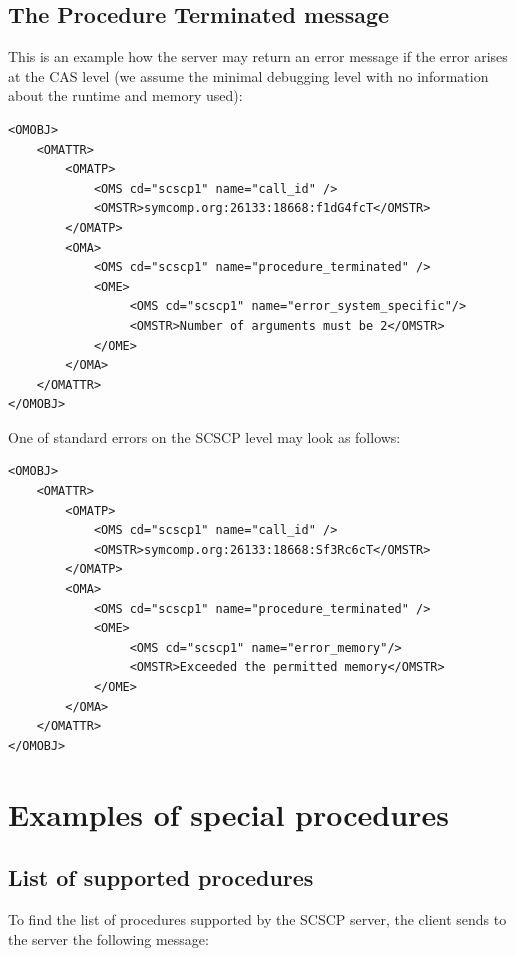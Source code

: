 \documentclass{amsart}
\begin{document}
\newpage

\subsection{The Procedure Terminated message}

This is an example how the server
may return an error message if the error arises at the CAS level
(we assume the minimal debugging level with no information 
about the runtime and memory used):

\begin{verbatim}
<OMOBJ>
    <OMATTR>
        <OMATP>
            <OMS cd="scscp1" name="call_id" />
            <OMSTR>symcomp.org:26133:18668:f1dG4fcT</OMSTR>
        </OMATP>
        <OMA>
            <OMS cd="scscp1" name="procedure_terminated" />
            <OME>
                 <OMS cd="scscp1" name="error_system_specific"/>
                 <OMSTR>Number of arguments must be 2</OMSTR>
            </OME>
        </OMA>
    </OMATTR>
</OMOBJ>
\end{verbatim}

\vspace{10pt}
One of standard errors on the SCSCP level may look as follows:
\vspace{5pt}

\begin{verbatim}
<OMOBJ>
    <OMATTR>
        <OMATP>
            <OMS cd="scscp1" name="call_id" />
            <OMSTR>symcomp.org:26133:18668:Sf3Rc6cT</OMSTR>
        </OMATP>
        <OMA>
            <OMS cd="scscp1" name="procedure_terminated" />
            <OME>
                 <OMS cd="scscp1" name="error_memory"/>
                 <OMSTR>Exceeded the permitted memory</OMSTR>
            </OME>
        </OMA>
    </OMATTR>
</OMOBJ>
\end{verbatim}

\newpage

\section{Examples of special procedures}

\subsection{List of supported procedures}

To find the list of procedures supported by the SCSCP server,
the client sends to the server the following message:
\end{document}
